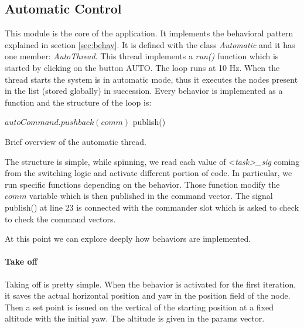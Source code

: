 \subsection{Automatic Control}
\label{sec:auto}
This module is the core of the application. It implements the behavioral pattern explained in section \ref{sec:behav}. It is defined with the class \textit{Automatic} and it has one member: \textit{AutoThread}. This thread implements a \textit{run()} function which is started by clicking on the button AUTO. The loop runs at 10 Hz. When the thread starts the system is in automatic mode, thus it executes the nodes present in the list (stored globally) in succession. Every behavior is implemented as a function and the structure of the loop is:
\begin{algorithm}
\begin{algorithmic} [1]
 
\ENDIF
{}			  
\ENDIF
{}			  
\ENDIF
{}		  
\ENDIF
{}			  
\ENDIF
{}			  
\ENDIF
\STATE $autoCommand.pushback(comm)$ 
\STATE publish()
\ENDWHILE
\end{algorithmic}
\label{alg:autothread}
\caption{Brief overview of the automatic thread.}
\end{algorithm}
The structure is simple, while spinning, we read each value of <\textit{task>\_sig} coming from the switching logic and activate different portion of code. In particular, we run specific functions depending on the behavior. Those function modify the $comm$ variable which is then published in the command vector. The signal publish() at line 23 is connected with the commander slot which is asked to check to check the command vectors. 

At this point we can explore deeply how behaviors are implemented.

\paragraph{Take off} Taking off is pretty simple. When the behavior is activated for the first iteration, it saves the actual horizontal position and yaw in the position field of the node. Then a set point is issued on the vertical of the starting position at a fixed altitude with the initial yaw. The altitude is given in the params vector.

